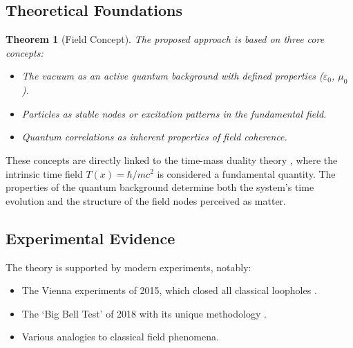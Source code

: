 \documentclass[12pt,a4paper]{article}
\newtheorem{theorem}{Theorem}[section]
\begin{document}
	\subsection{Theoretical Foundations}
	\begin{theorem}[Field Concept]
		The proposed approach is based on three core concepts:
		\begin{itemize}
			\item The vacuum as an active quantum background with defined properties (\(\varepsilon_0\), \(\mu_0\)).
			\item Particles as stable nodes or excitation patterns in the fundamental field.
			\item Quantum correlations as inherent properties of field coherence.
		\end{itemize}
	\end{theorem}
	These concepts are directly linked to the time-mass duality theory \cite{Pascher2024}\relax, where the intrinsic time field \(T(x) = \hbar/mc^2\) is considered a fundamental quantity. The properties of the quantum background determine both the system's time evolution and the structure of the field nodes perceived as matter.
	
	\subsection{Experimental Evidence}
	The theory is supported by modern experiments, notably:
	\begin{itemize}
		\item The Vienna experiments of 2015, which closed all classical loopholes \cite{Giustina2015}\relax.
		\item The `Big Bell Test' of 2018 with its unique methodology \cite{BigBellTest2018}\relax.
		\item Various analogies to classical field phenomena.
	\end{itemize}
	
\end{document}
